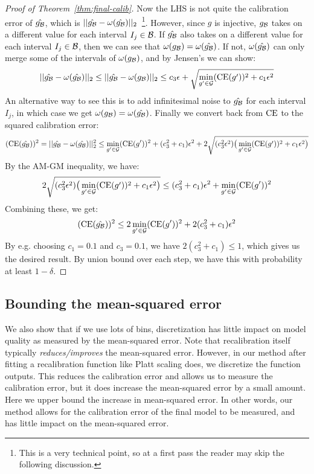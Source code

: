 \begin{proof}[Proof of Theorem~\ref{thm:final-calib}]
Now the LHS is not quite the calibration error of $\hat{g_{\mathcal{B}{}}}$, which is $||\hat{g_{\mathcal{B}{}}} - \omega(\hat{g_{\mathcal{B}{}}})||_2$~\footnote{This is a very technical point, so at a first pass the reader may skip the following discussion.}.
However, since $g$ is injective, $g_{\mathcal{B}{}}$ takes on a different value for each interval $I_j \in \mathcal{B}{}$.
If $\hat{g_{\mathcal{B}{}}}$ also takes on a different value for each interval $I_j \in \mathcal{B}{}$, then we can see that $\omega(g_{\mathcal{B}{}}) = \omega(\hat{g_{\mathcal{B}{}}})$.
If not, $\omega(\hat{g_{\mathcal{B}{}}})$ can only merge some of the intervals of $\omega(g_{\mathcal{B}{}})$, and by Jensen's we can show:
\[ ||\hat{g_{\mathcal{B}{}}} - \omega(\hat{g_{\mathcal{B}{}}})||_2 \leq ||\hat{g_{\mathcal{B}{}}} - \omega(g_{\mathcal{B}{}})||_2 \leq c_3 \epsilon + \sqrt{\min_{g' \in \mathcal{G}{}}(\textup{CE}(g'))^2 + c_1 \epsilon^2} \]
An alternative way to see this is to add infinitesimal noise to $\hat{g_{\mathcal{B}{}}}$ for each interval $I_j$, in which case we get $\omega(g_{\mathcal{B}{}}) = \omega(\hat{g_{\mathcal{B}{}}})$.
Finally we convert back from $\textup{CE}{}$ to the squared calibration error:
\[ (\textup{CE}(\hat{g_{\mathcal{B}{}}}))^2 = ||\hat{g_{\mathcal{B}{}}} - \omega(\hat{g_{\mathcal{B}{}}})||_2^2 \leq \min_{g' \in \mathcal{G}{}}(\textup{CE}(g'))^2 + (c_3^2 + c_1) \epsilon^2 + 2\sqrt{(c_3^2 \epsilon^2) \big(\min_{g' \in \mathcal{G}{}}(\textup{CE}(g'))^2 + c_1 \epsilon^2\big)} \]
By the AM-GM inequality, we have:
\[ 2\sqrt{(c_3^2 \epsilon^2) \big(\min_{g' \in \mathcal{G}{}}(\textup{CE}(g'))^2 + c_1 \epsilon^2\big)} \leq (c_3^2 + c_1) \epsilon^2 + \min_{g' \in \mathcal{G}{}}(\textup{CE}(g'))^2 \]
Combining these, we get:
\[ (\textup{CE}(\hat{g_{\mathcal{B}{}}}))^2 \leq 2 \min_{g' \in \mathcal{G}{}}(\textup{CE}(g'))^2 + 2(c_3^2 + c_1) \epsilon^2 \]
By e.g. choosing $c_1 = 0.1$ and $c_3 = 0.1$, we have $2(c_3^2 + c_1) \leq 1$, which gives us the desired result. By union bound over each step, we have this with probability at least $1 - \delta$.


\end{proof}

\subsection{Bounding the mean-squared error}

We also show that if we use lots of bins, discretization has little impact on model quality as measured by the mean-squared error.
Note that recalibration itself typically \emph{reduces/improves} the mean-squared error.
However, in our method after fitting a recalibration function like Platt scaling does, we discretize the function outputs.
This reduces the calibration error and allows us to measure the calibration error, but it does increase the mean-squared error by a small amount.
Here we upper bound the increase in mean-squared error.
In other words, our method allows for the calibration error of the final model to be measured, and has little impact on the mean-squared error.

